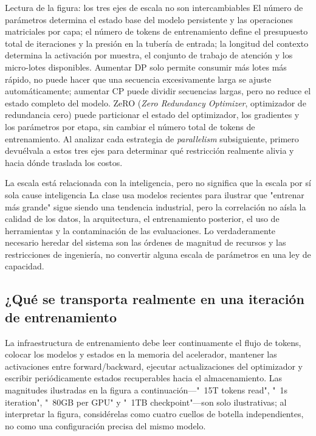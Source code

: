 \documentclass[a4paper]{article}
\begin{document}
\begin{knowledgebox}{Lectura de la figura: los tres ejes de escala no son intercambiables}
El número de parámetros determina el estado base del modelo persistente y las operaciones matriciales por capa; el número de tokens de entrenamiento define el presupuesto total de iteraciones y la presión en la tubería de entrada; la longitud del contexto determina la activación por muestra, el conjunto de trabajo de atención y los micro-lotes disponibles. Aumentar DP solo permite consumir más lotes más rápido, no puede hacer que una secuencia excesivamente larga se ajuste automáticamente; aumentar CP puede dividir secuencias largas, pero no reduce el estado completo del modelo. ZeRO (\textit{Zero Redundancy Optimizer}, optimizador de redundancia cero) puede particionar el estado del optimizador, los gradientes y los parámetros por etapa, sin cambiar el número total de tokens de entrenamiento. Al analizar cada estrategia de \textit{parallelism} subsiguiente, primero devuélvala a estos tres ejes para determinar qué restricción realmente alivia y hacia dónde traslada los costos.
\end{knowledgebox}


\begin{warningbox}{La escala está relacionada con la inteligencia, pero no significa que la escala por sí sola cause inteligencia}
La clase usa modelos recientes para ilustrar que "entrenar más grande" sigue siendo una tendencia industrial, pero la correlación no aísla la calidad de los datos, la arquitectura, el entrenamiento posterior, el uso de herramientas y la contaminación de las evaluaciones. Lo verdaderamente necesario heredar del sistema son las órdenes de magnitud de recursos y las restricciones de ingeniería, no convertir alguna escala de parámetros en una ley de capacidad.
\end{warningbox}

\subsection{¿Qué se transporta realmente en una iteración de entrenamiento}

La infraestructura de entrenamiento debe leer continuamente el flujo de tokens, colocar los modelos y estados en la memoria del acelerador, mantener las activaciones entre forward/backward, ejecutar actualizaciones del optimizador y escribir periódicamente estados recuperables hacia el almacenamiento. Las magnitudes ilustradas en la figura a continuación—"~15T tokens read", "~1s iteration", "~80GB per GPU" y "~1TB checkpoint"—son solo ilustrativas; al interpretar la figura, considérelas como cuatro cuellos de botella independientes, no como una configuración precisa del mismo modelo.
\end{document}
